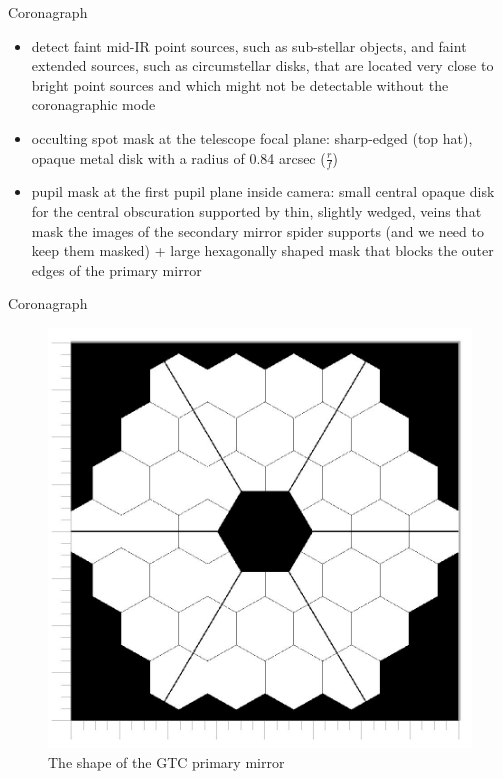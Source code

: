 \documentclass{beamer}
\begin{document}
\begin{frame}{Coronagraph}
\begin{itemize}
\item detect faint mid-IR point sources, such as
sub-stellar objects, and faint extended sources, such as circumstellar disks, that are
located very close to bright point sources and which might not be detectable without the
coronagraphic mode
\item occulting spot mask at the telescope focal plane:
sharp-edged (top hat), opaque metal disk with a
radius of 0.84 arcsec ($\frac{r}{f}$)

\item pupil mask at the first pupil plane inside camera: small central opaque disk for the
central obscuration supported by thin, slightly wedged, veins that mask the images of the secondary mirror
spider supports (and we need to keep them masked)  + large hexagonally shaped mask
that blocks the outer edges of the primary mirror 
\end{itemize}

\end{frame}
\begin{frame}{Coronagraph}
\begin{figure}[H]
 \centering
 \includegraphics[scale=0.2]{Image82.jpg}
\caption{The shape of the GTC primary mirror}
\end{figure}

\end{frame}
\end{document}
